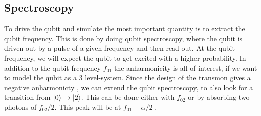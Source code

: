 \subsection{Spectroscopy}
To drive the qubit and simulate the most important quantity is to extract the qubit frequency. This is done by doing qubit spectroscopy, where the qubit is driven out by a pulse of a given frequency and then read out. At the qubit frequency, we will expect the qubit to get excited with a higher probability. In addition to the qubit frequency $f_{01}$ the anharmonicity is all of interest, if we want to model the qubit as a 3 level-system. Since the design of the transmon gives a negative anharmonicty , we can extend the qubit spectroscopy, to also look for a transition from $\ket{0}\to \ket{2}$. This can be done either with $f_{02}$ or by absorbing two photons of $f_{02} / 2$. This peak will be at $f_{01} - \alpha / 2$ . 
